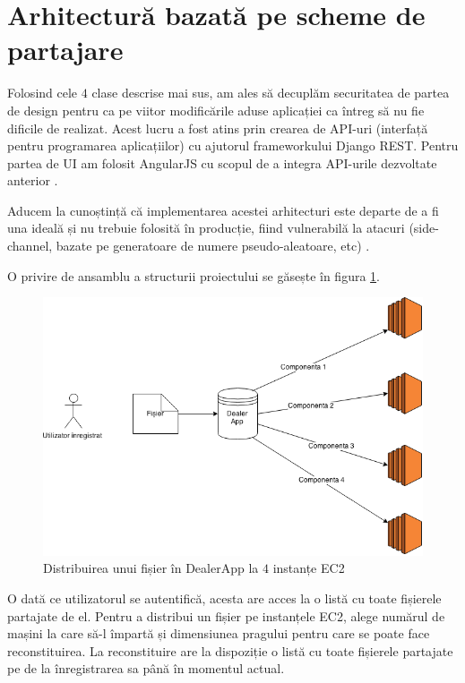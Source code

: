 \documentclass[oneside, 12pt]{book}
\begin{document}
\section{Arhitectură bazată pe scheme de partajare}

Folosind cele $4$ clase descrise mai sus, am ales să decuplăm securitatea de partea de design pentru ca pe viitor modificările aduse aplicației ca întreg să nu fie dificile de realizat. Acest lucru a fost atins prin crearea de API-uri (interfață pentru programarea aplicațiilor) cu ajutorul frameworkului Django REST. Pentru partea de UI am folosit AngularJS cu scopul de a integra API-urile dezvoltate anterior \cite{website:angularjs, website:django-rest}.

Aducem la cunoștință că implementarea acestei arhitecturi este departe de a fi una ideală și nu trebuie folosită în producție, fiind vulnerabilă la atacuri (side-channel, bazate pe generatoare de numere pseudo-aleatoare, etc) \cite{kocher:1996timing, gutterman:2006analysis}.

O privire de ansamblu a structurii proiectului se găsește în figura \ref{fig:dealerapp}.

\begin{figure}
	\begin{center}
	\includegraphics[width=1\textwidth]{img/DealerApp.png}
	\caption{Distribuirea unui fișier în DealerApp la $4$ instanțe EC2}
	\label{fig:dealerapp}
	\end{center}
	\bigskip
\end{figure}


O dată ce utilizatorul se autentifică, acesta are acces la o listă cu toate fișierele partajate de el. Pentru a distribui un fișier pe instanțele EC2, alege numărul de mașini la care să-l împartă și dimensiunea pragului pentru care se poate face reconstituirea. La reconstituire are la dispoziție o listă cu toate fișierele partajate pe de la înregistrarea sa până în momentul actual.
\end{document}
